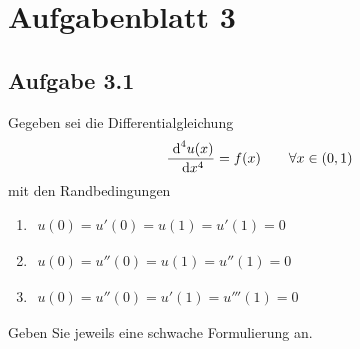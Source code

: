 
\section{Aufgabenblatt 3}
\subsection{Aufgabe 3.1}
Gegeben sei die Differentialgleichung 
\begin{align*}
	\frac{\text{ d}^4 u(x)}{\text{ d} x^4}=f(x)\qquad\forall x\in(0,1)
\end{align*}
mit den Randbedingungen
\begin{enumerate}[label=(\alph*)]
	\item $\begin{aligned}
		u(0)=u'(0)=u(1)=u'(1)=0
	\end{aligned}$
	\item $\begin{aligned}
		u(0)=u''(0)=u(1)=u''(1)=0
	\end{aligned}$
	\item $\begin{aligned}
		u(0)=u''(0)=u'(1)=u'''(1)=0
	\end{aligned}$
\end{enumerate}
Geben Sie jeweils eine schwache Formulierung an.

